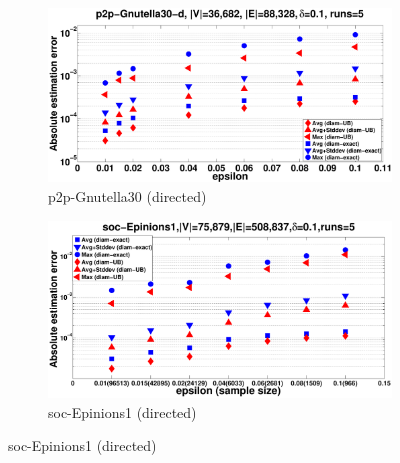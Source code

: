 \begin{figure}[htbp]
  \centering
  \begin{subfigure}[b]{1\textwidth}
  \centering
    \includegraphics[width=\textwidth,height=0.18\textheight]{figures/eps/p2p-Gnutella30-error}
    \caption{p2p-Gnutella30 (directed)}
    \label{fig:gnutella:error}
  \end{subfigure}

  \begin{subfigure}[b]{1\textwidth}
	\centering
    \includegraphics[width=\textwidth,height=0.18\textheight]{figures/eps/soc-Epinions1-error}
    \caption{soc-Epinions1 (directed)}
    \label{fig:Epinions:error}
  \end{subfigure}


\end{figure}
